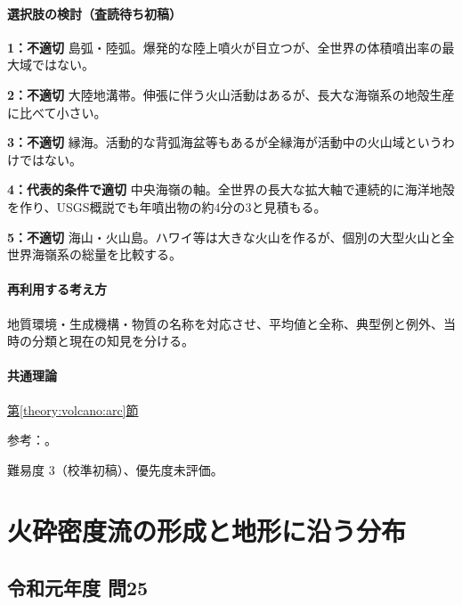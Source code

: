 \paragraph{選択肢の検討（査読待ち初稿）}\mbox{}\par

\noindent\textbf{1：不適切} 島弧・陸弧。爆発的な陸上噴火が目立つが、全世界の体積噴出率の最大域ではない。\par

\noindent\textbf{2：不適切} 大陸地溝帯。伸張に伴う火山活動はあるが、長大な海嶺系の地殻生産に比べて小さい。\par

\noindent\textbf{3：不適切} 縁海。活動的な背弧海盆等もあるが全縁海が活動中の火山域というわけではない。\par

\noindent\textbf{4：代表的条件で適切} 中央海嶺の軸。全世界の長大な拡大軸で連続的に海洋地殻を作り、USGS概説でも年噴出物の約4分の3と見積もる。\par

\noindent\textbf{5：不適切} 海山・火山島。ハワイ等は大きな火山を作るが、個別の大型火山と全世界海嶺系の総量を比較する。\par

\paragraph{再利用する考え方} 地質環境・生成機構・物質の名称を対応させ、平均値と全称、典型例と例外、当時の分類と現在の知見を分ける。

\paragraph{共通理論} \hyperref[theory:volcano:arc]{第\ref*{theory:volcano:arc}節}

\par 参考：\cite{vol50_ridge_ref}。

\par 難易度 3（校準初稿）、優先度未評価。

\section{火砕密度流の形成と地形に沿う分布}

\subsection{令和元年度 問25}
\label{q:r01-reg-applied-25}

